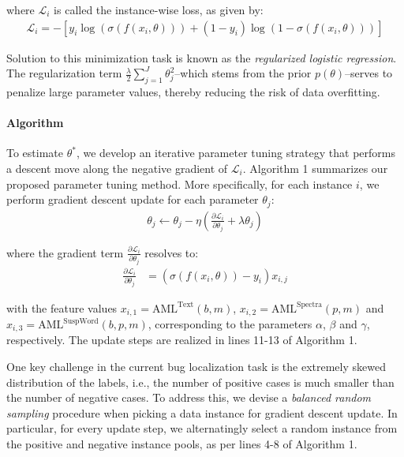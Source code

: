 \noindent where $\mathcal{L}_i$ is called the instance-wise loss, as given by:
\begin{align}
\label{eq:instance-wise-loss}
\mathcal{L}_i = -\left[ y_i \log(\sigma(f(x_i, \theta))) + (1 - y_i) \log(1 - \sigma(f(x_i, \theta))) \right]
\end{align}

\noindent Solution to this minimization task is known as the \emph{regularized logistic regression}. The regularization term $\frac{\lambda}{2} \sum_{j=1}^J \theta_j^2$--which stems from the prior $p(\theta)$--serves to penalize large parameter values, thereby reducing the risk of data overfitting.

\paragraph{Algorithm} \hspace{0pt} 
To estimate $\theta^{*}$, we develop an iterative parameter tuning strategy that performs a descent move along the negative gradient of $\mathcal{L}_i$. Algorithm 1 summarizes our proposed parameter tuning method. More specifically, for each instance $i$, we perform gradient descent update for each parameter $\theta_j$:
\begin{align}
\theta_j \leftarrow \theta_j - \eta \left( \frac{\partial \mathcal{L}_i}{\partial \theta_j} + \lambda \theta_j \right)
\end{align}

\noindent where the gradient term $\frac{\partial \mathcal{L}_i}{\partial \theta_j}$ resolves to:
\begin{align}
\frac{\partial \mathcal{L}_i}{\partial \theta_j} &= \left( \sigma(f(x_i, \theta)) - y_i \right) x_{i,j}
\end{align}

\noindent with the feature values $x_{i,1} = \text{AML}^\text{Text}(b,m)$, $x_{i,2} = \text{AML}^\text{Spectra}(p,m)$ and $x_{i,3} = \text{AML}^\text{SuspWord}(b,p,m)$, corresponding to the parameters $\alpha$, $\beta$ and $\gamma$, respectively. The update steps are realized in lines 11-13 of Algorithm 1.

One key challenge in the current bug localization task is the extremely skewed distribution of the labels, i.e., the number of positive cases is much smaller than the number of negative cases. To address this, we devise a \emph{balanced random sampling} procedure when picking a data instance for gradient descent update. In particular, for every update step, we alternatingly select a random instance from the positive and negative instance pools, as per lines 4-8 of Algorithm 1.

